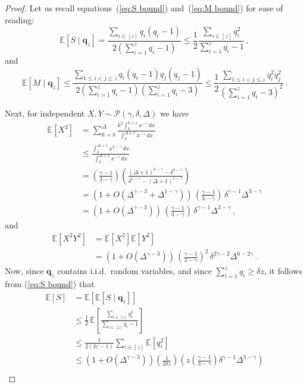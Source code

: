 \documentclass[12pt]{article}
\theoremstyle{definition}
\theoremstyle{remark}
\theoremstyle{remark}
\numberwithin{theorem}{section}
\newcommand{\E}[1]{{\mathbb E}\left[#1\right]}
\newcommand{\Cexp}[2]{\mathbb{E}\left[ \left. #1 \; \right| \; #2 \right]}
\newcommand{\tpl}[3]{\ensuremath{\mathcal{P}\left(#1,#2,#3\right)}}
\begin{document}
\begin{proof}
Let us recall equations~(\ref{eq:S bound}) and~(\ref{eq:M bound}) for ease of reading:
\[
\Cexp{S}{\mathbf{q}_z} = \frac{\sum_{i \in [z]} q_i(q_i-1)}{2 \left(\sum_{i=1}^z q_i - 1\right)} 
\leq 
\frac{1}{2} \frac{\sum_{i \in [z]} q_i^2}{\sum_{i=1}^z q_i - 1} 
\,,
\]
and
\[
\Cexp{M}{\mathbf{q}_z} \leq \frac{\sum_{1 \leq i < j \leq z} q_i(q_i-1)q_j(q_j-1)}{2\left( \sum_{i=1}^z q_i - 1 \right)\left( \sum_{i=1}^z q_i - 3 \right)} 
\leq 
\frac{1}{2} \frac{\sum_{1 \leq i < j \leq z} q_i^2 q_j^2}{\left( \sum_{i=1}^z q_i - 3 \right)^2} 
\,.
\]

Next, for independent $X,Y \sim \tpl{\gamma}{\delta}{\Delta}$ we have 
\begin{align*}
\E{X^2} &= \sum_{k=\delta}^\Delta \frac{k^2 \int_k^{k+1} x^{-\gamma} \, dx}{\int_\delta^{\Delta +1} x^{-\gamma} \, dx} \\
&\leq \frac{\int_\delta^{\Delta +1} x^{2-\gamma} \, dx}{\int_{\delta}^{\Delta+1} x^{-\gamma} \, dx} \\
&= \left(\frac{\gamma-1}{3-\gamma}\right) \left(\frac{(\Delta+1)^{3-\gamma} - \delta^{3-\gamma}}{\delta^{1-\gamma} - (\Delta +1)^{1-\gamma}} \right)  \\
&= (1+O(\Delta^{\gamma-3} + \Delta^{1-\gamma})) \, \left(\frac{\gamma-1}{3-\gamma}\right) \, \delta^{\gamma - 1} \Delta^{3-\gamma}\\
&= (1+O(\Delta^{\gamma-3})) \, \left(\frac{\gamma-1}{3-\gamma}\right) \, \delta^{\gamma - 1} \Delta^{3-\gamma} \,,
\end{align*}
and 
\begin{align*}
\E{X^2Y^2} &= \E{X^2}\E{Y^2}\\
&= (1+O(\Delta^{\gamma-3})) \, \left(\frac{\gamma-1}{3-\gamma}\right)^2 \, \delta^{2\gamma - 2} \Delta^{6-2\gamma} \,.
\end{align*}
Now, since $\mathbf{q}_z$ contains i.i.d.\ random variables, and since $\sum_{i=1}^z q_i \geq \delta z$, it follows from (\ref{eq:S bound}) that 
\begin{align*}
\E{S} &= \E{\Cexp{S}{\mathbf{q}_z}}\\
&\leq
\frac{1}{2} \, \E{\frac{\sum_{i \in [z]} q_i^2}{\sum_{i \in [z]} q_i - 1}}\\
&\le
\frac{1}{2(\delta z - 1)} \sum_{i \in [z]}\E{q_i^2}\\
&\leq
(1+O(\Delta^{\gamma-3})) \left(\frac{1}{2 \delta z} \right) \left( z \left(\frac{\gamma-1}{3-\gamma}\right) \delta^{\gamma-1} \Delta^{3-\gamma} \right) \\

\end{align*}
\end{proof}
\end{document}
